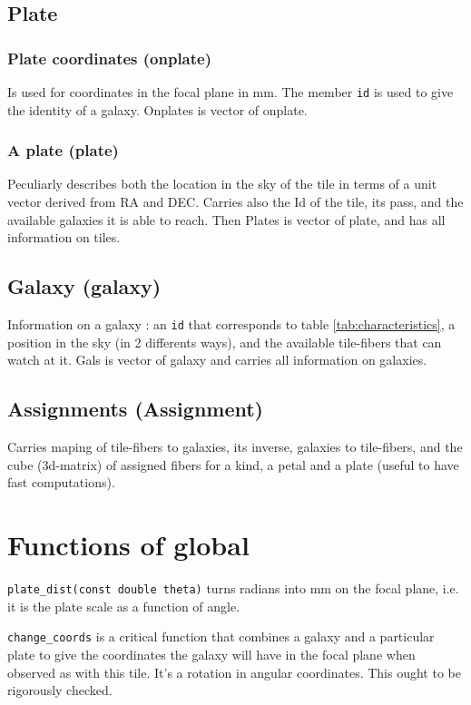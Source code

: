 \documentclass{article}
\begin{document}
\subsection{Plate}

\subsubsection{Plate coordinates (onplate)}
  Is used for coordinates in the focal plane in mm.  The member {\tt id} is used to give the identity of a galaxy. Onplates is vector of onplate.

\subsubsection{A plate (plate)}
Peculiarly describes both the location in the sky of the tile in terms of a unit vector derived from RA and DEC. Carries also the Id of the tile, its pass, and the available galaxies it is able to reach. Then Plates is vector of plate, and has all information on tiles.

\subsection{Galaxy (galaxy)}
Information on a galaxy : an {\tt id} that corresponds to table \ref{tab:characteristics}, a position in the sky (in 2 differents ways), and the available tile-fibers that can watch at it. Gals is vector of galaxy and carries all information on galaxies.

\subsection{Assignments (Assignment)}
Carries maping of tile-fibers to galaxies, its inverse, galaxies to tile-fibers, and the cube (3d-matrix) of assigned fibers for a kind, a petal and a plate (useful to have fast computations).

\section{Functions of global}
  {\tt plate\_dist(const double theta)} turns radians into mm on the focal plane, i.e. it is the plate scale as a function of angle.

  {\tt change\_coords} is a critical function that combines a galaxy and a particular plate to give the coordinates the galaxy will have in the focal plane when observed as with this tile. It's a rotation in angular coordinates. This ought to be rigorously checked.
\end{document}
